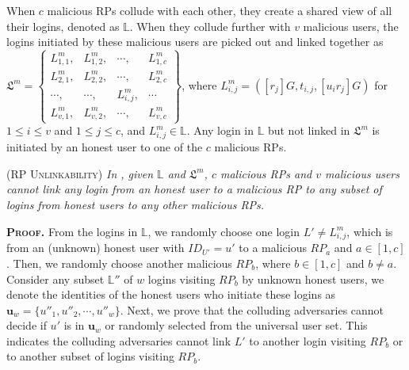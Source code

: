 When $c$ malicious RPs collude with each other, they create a shared view of all their logins, denoted as $\mathbb{L}$.
When they collude further with $v$ malicious users, the logins initiated by these malicious users are picked out and linked together as
$\mathfrak{L}^m=\left \{ \begin{matrix}
L^m_{1,1},&L^m_{1,2},&\cdots,&L^m_{1,c}\\
L^m_{2,1},& L^m_{2,2},&\cdots,&L^m_{2,c}\\
\cdots,&\cdots,&L^m_{i,j},&\cdots\\
L^m_{v,1},&L^m_{v,2},&\cdots,&L^m_{v,c}
\end{matrix}\right\}$,
where $L^m_{i, j}=([r_j]G, t_{i,j}, [u_ir_j]G)$ for $1 \le i \le v$ and $1 \le j \le c$, and $L^m_{i,j} \in \mathbb{L}$. Any login in $\mathbb{L}$ but not linked in $\mathfrak{L}^m$ is initiated by an honest user to one of the $c$ malicious RPs.


\begin{thm}
\textsc{(RP Unlinkability)} \emph{In \usso, given $\mathbb{L}$ and $\mathfrak{L}^m$, $c$ malicious RPs and $v$ malicious users cannot link any login from an honest user to a malicious RP to any subset of logins from honest users to any other malicious RPs.}
\end{thm}


\noindent\textbf{\textsc{Proof.}} From the logins in $\mathbb{L}$,
 we randomly choose one login $L' \neq L^m_{i,j}$,
 which is from an (unknown) honest user with $ID_{U'}=u'$ to a malicious $RP_a$ and $a \in [1,c]$.
Then, we randomly choose another malicious $RP_b$, where $b \in [1,c]$ and $b \neq a$.
Consider any subset $\mathbb{L}''$ of $w$ logins visiting $RP_b$ by unknown honest users,
 we denote the identities of the honest users who initiate these logins as $\mathbf{u}_w=\{{u''_1}, {u''_2}, \cdots, {u''_w}\}$.
Next, we prove that the colluding adversaries cannot decide if $u'$ is in $\mathbf{u}_w$ or randomly selected from the universal user set.
This indicates the colluding adversaries cannot link $L'$ to another login visiting $RP_b$
    or to another subset of logins visiting $RP_b$.

